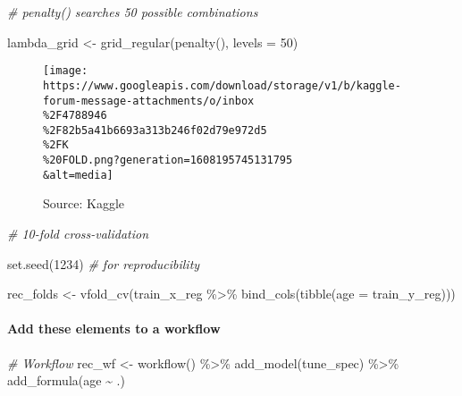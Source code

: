 \documentclass[
]{book}
\newenvironment{Shaded}{\begin{snugshade}}{\end{snugshade}}
\newcommand{\AttributeTok}[1]{\textcolor[rgb]{0.77,0.63,0.00}{#1}}
\newcommand{\CommentTok}[1]{\textcolor[rgb]{0.56,0.35,0.01}{\textit{#1}}}
\newcommand{\DecValTok}[1]{\textcolor[rgb]{0.00,0.00,0.81}{#1}}
\newcommand{\FunctionTok}[1]{\textcolor[rgb]{0.00,0.00,0.00}{#1}}
\newcommand{\NormalTok}[1]{#1}
\newcommand{\OtherTok}[1]{\textcolor[rgb]{0.56,0.35,0.01}{#1}}
\newcommand{\SpecialCharTok}[1]{\textcolor[rgb]{0.00,0.00,0.00}{#1}}
\begin{document}
\begin{Shaded}
\begin{Highlighting}[]
\CommentTok{\# penalty() searches 50 possible combinations}

\NormalTok{lambda\_grid }\OtherTok{\textless{}{-}} \FunctionTok{grid\_regular}\NormalTok{(}\FunctionTok{penalty}\NormalTok{(), }\AttributeTok{levels =} \DecValTok{50}\NormalTok{)}
\end{Highlighting}
\end{Shaded}

\begin{figure}
\centering
\texttt{[image: https://www.googleapis.com/download/storage/v1/b/kaggle-forum-message-attachments/o/inbox\\\%2F4788946\\\%2F82b5a41b6693a313b246f02d79e972d5\\\%2FK\\\%20FOLD.png?generation=1608195745131795\\\&alt=media]}
\caption{Source: Kaggle}
\end{figure}

\begin{Shaded}
\begin{Highlighting}[]
\CommentTok{\# 10{-}fold cross{-}validation}

\FunctionTok{set.seed}\NormalTok{(}\DecValTok{1234}\NormalTok{) }\CommentTok{\# for reproducibility}

\NormalTok{rec\_folds }\OtherTok{\textless{}{-}} \FunctionTok{vfold\_cv}\NormalTok{(train\_x\_reg }\SpecialCharTok{\%\textgreater{}\%} \FunctionTok{bind\_cols}\NormalTok{(}\FunctionTok{tibble}\NormalTok{(}\AttributeTok{age =}\NormalTok{ train\_y\_reg)))}
\end{Highlighting}
\end{Shaded}

\hypertarget{add-these-elements-to-a-workflow}{%
\paragraph{Add these elements to a workflow}\label{add-these-elements-to-a-workflow}}

\begin{Shaded}
\begin{Highlighting}[]
\CommentTok{\# Workflow}
\NormalTok{rec\_wf }\OtherTok{\textless{}{-}} \FunctionTok{workflow}\NormalTok{() }\SpecialCharTok{\%\textgreater{}\%}
  \FunctionTok{add\_model}\NormalTok{(tune\_spec) }\SpecialCharTok{\%\textgreater{}\%}
  \FunctionTok{add\_formula}\NormalTok{(age }\SpecialCharTok{\textasciitilde{}}\NormalTok{ .)}
\end{Highlighting}
\end{Shaded}
\end{document}
